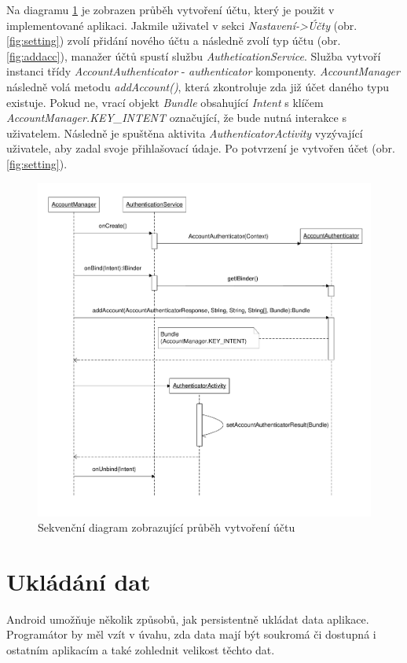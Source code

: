 \documentclass{diplomka}
\begin{document}
Na diagramu \ref{fig:andauth} je zobrazen průběh vytvoření účtu, který je použit v implementované aplikaci. Jakmile uživatel v sekci \emph{Nastavení->Účty} (obr. \ref{fig:setting}) zvolí přidání nového účtu a následně zvolí typ účtu (obr. \ref{fig:addacc}), manažer účtů spustí službu \emph{AutheticationService}. Služba vytvoří instanci třídy \emph{AccountAuthenticator} - \emph{authenticator} komponenty. \emph{AccountManager} následně volá metodu \emph{addAccount()}, která zkontroluje zda již účet daného typu existuje. Pokud ne, vrací objekt \emph{Bundle} obsahující \emph{Intent} s klíčem \emph{AccountManager.KEY\_INTENT} označující, že bude nutná interakce s uživatelem. Následně je spuštěna aktivita \emph{AuthenticatorActivity} vyzývající uživatele, aby zadal svoje přihlašovací údaje. Po potvrzení je vytvořen účet (obr. \ref{fig:setting}).
\begin{figure}[H]
  \centering
  \includegraphics[scale=0.7]{visio/andauth.pdf}
\caption{Sekvenční diagram zobrazující průběh vytvoření účtu}
\label{fig:andauth}
\end{figure}



\section{Ukládání dat}
Android umožňuje několik způsobů, jak persistentně ukládat data aplikace. Programátor by měl vzít v úvahu, zda data mají být soukromá či dostupná i ostatním aplikacím a také zohlednit velikost těchto dat. 
\end{document}
